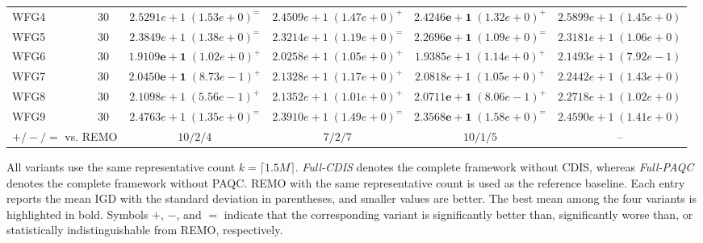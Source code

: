 \begin{table}[tp]
\begin{tabular*}{\textwidth}{@{\extracolsep{\fill}}lccccc@{}}
WFG4 & 30 & $2.5291e+1\;(1.53e+0)^{=}$ & $2.4509e+1\;(1.47e+0)^{+}$ & $\mathbf{2.4246e+1}\;(1.32e+0)^{+}$ & $2.5899e+1\;(1.45e+0)$ \\
WFG5 & 30 & $2.3849e+1\;(1.38e+0)^{=}$ & $2.3214e+1\;(1.19e+0)^{=}$ & $\mathbf{2.2696e+1}\;(1.09e+0)^{=}$ & $2.3181e+1\;(1.06e+0)$ \\
WFG6 & 30 & $\mathbf{1.9109e+1}\;(1.02e+0)^{+}$ & $2.0258e+1\;(1.05e+0)^{+}$ & $1.9385e+1\;(1.14e+0)^{+}$ & $2.1493e+1\;(7.92e-1)$ \\
WFG7 & 30 & $\mathbf{2.0450e+1}\;(8.73e-1)^{+}$ & $2.1328e+1\;(1.17e+0)^{+}$ & $2.0818e+1\;(1.05e+0)^{+}$ & $2.2442e+1\;(1.43e+0)$ \\
WFG8 & 30 & $2.1098e+1\;(5.56e-1)^{+}$ & $2.1352e+1\;(1.01e+0)^{+}$ & $\mathbf{2.0711e+1}\;(8.06e-1)^{+}$ & $2.2718e+1\;(1.02e+0)$ \\
WFG9 & 30 & $2.4763e+1\;(1.35e+0)^{=}$ & $2.3910e+1\;(1.49e+0)^{=}$ & $\mathbf{2.3568e+1}\;(1.58e+0)^{=}$ & $2.4590e+1\;(1.41e+0)$ \\
\midrule
\multicolumn{2}{l}{$+/-/=$ vs. REMO} & $10/2/4$ & $7/2/7$ & $10/1/5$ & -- \\
\bottomrule
\end{tabular*}
\par\smallskip
\begin{minipage}{\textwidth}\footnotesize
All variants use the same representative count $k=\lceil1.5M\rceil$. \textit{Full-CDIS} denotes the complete framework without CDIS, whereas \textit{Full-PAQC} denotes the complete framework without PAQC. REMO with the same representative count is used as the reference baseline. Each entry reports the mean IGD with the standard deviation in parentheses, and smaller values are better. The best mean among the four variants is highlighted in bold. Symbols $+$, $-$, and $=$ indicate that the corresponding variant is significantly better than, significantly worse than, or statistically indistinguishable from REMO, respectively.
\end{minipage}
\end{table}
